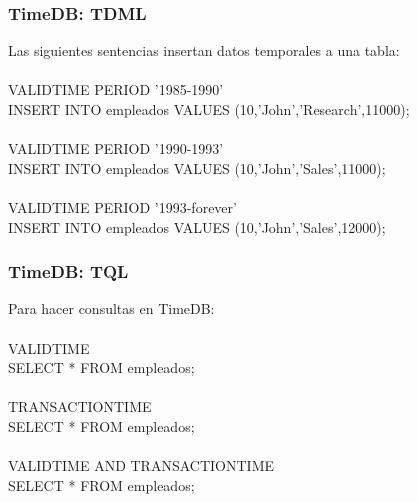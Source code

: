 \documentclass[a4paper,12pt,oneside]{report}
\begin{document}
\subsubsection*{TimeDB: TDML}
Las siguientes sentencias insertan datos temporales a una tabla:\\
\ \\
VALIDTIME PERIOD '1985-1990'\\
INSERT INTO empleados VALUES (10,'John','Research',11000);\\
\ \\
VALIDTIME PERIOD '1990-1993'\\
INSERT INTO empleados VALUES (10,'John','Sales',11000);\\
\ \\
VALIDTIME PERIOD '1993-forever'\\
INSERT INTO empleados VALUES (10,'John','Sales',12000);
\subsubsection*{TimeDB: TQL}
Para hacer consultas en TimeDB:\\
\ \\
VALIDTIME\\
SELECT * FROM empleados;\\
\ \\
TRANSACTIONTIME\\
SELECT * FROM empleados;\\
\ \\
VALIDTIME AND TRANSACTIONTIME\\
SELECT * FROM empleados;
\end{document}
